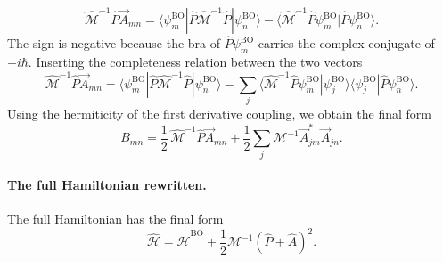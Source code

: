 \documentclass[11pt]{article}      %
\numberwithin{equation}{section}   %
\begin{document}
\begin{equation}
    \hat{\mathcal{M}}^{-1}\hat{P}\vec A_{mn}
    = \langle\psi^{\mathrm{BO}}_m|\hat{P}\hat{\mathcal{M}}^{-1}\hat{P}|\psi^{\mathrm{BO}}_n\rangle
    - \langle\hat{\mathcal{M}}^{-1}\hat{P}\psi^{\mathrm{BO}}_m|\hat{P}\psi^{\mathrm{BO}}_n\rangle .
\end{equation}
The sign is negative because the bra of $\hat{P}\psi^{\mathrm{BO}}_m$ carries the complex conjugate of $-i\hbar$. Inserting the completeness relation between the two vectors
\begin{equation}
    \hat{\mathcal{M}}^{-1}\hat{P}\vec A_{mn}
    = \langle\psi^{\mathrm{BO}}_m|\hat{P}\hat{\mathcal{M}}^{-1}\hat{P}|\psi^{\mathrm{BO}}_n\rangle
    - \sum_j\langle\hat{\mathcal{M}}^{-1}\hat{P}\psi^{\mathrm{BO}}_m|\psi^{\mathrm{BO}}_j\rangle\langle\psi^{\mathrm{BO}}_j|\hat{P}\psi^{\mathrm{BO}}_n\rangle .
\end{equation}
Using the hermiticity of the first derivative coupling, we obtain  the final form 
\begin{equation}
    \boxed{
        B_{mn} = \frac{1}{2}\,\hat{\mathcal{M}}^{-1}\hat{P}\vec A_{mn}
        +\frac{1}{2}\sum_j \mathcal M^{-1} \vec A^*_{jm}\vec A_{jn}.
    }
\end{equation}
\paragraph{The full Hamiltonian rewritten.}The full Hamiltonian has the final form 
\begin{equation}
    \boxed{
        \hat{\mathcal{H}} = \hat{\mathcal{H}}^{\mathrm{BO}} +\frac{1}{2}\mathcal M^{-1}(\hat P + \hat A)^2.
    }
\end{equation}
\end{document}
